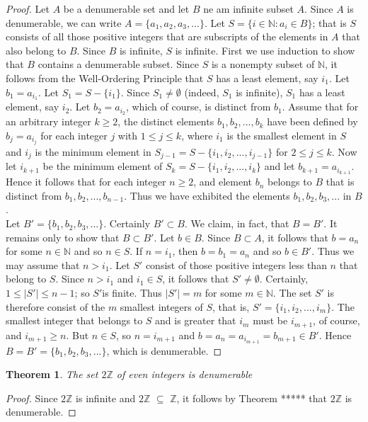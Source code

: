 \documentclass[10pt]{report}
\newtheorem{thm2}{Theorem}[section]
\begin{document}
\begin{proof}
Let $A$ be a denumerable set and let $B$ ne am infinite subset $A$. Since $A$ is denumerable, we can write $A = \{a_1, a_2, a_3,...\}$. Let $S=\{i\in \mathbb{N}: a_i\in B\}$; that is $S$ consists of all those positive integers that are subscripts of the elements in $A$ that also belong to $B$. Since $B$ is infinite, $S$ is infinite. First we use induction to show that $B$ contains a denumerable subset. Since $S$ is a nonempty subset of $\mathbb{N}$, it follows from the Well-Ordering Principle that $S$ has a least element, say $i_1$. Let $b_1=a_{i_1}$. Let $S_1=S-\{i_1\}$. Since $S_1\neq \emptyset$ (indeed, $S_1$ is infinite), $S_1$ has a least element, say $i_2$. Let $b_2=a_{i_2}$, which of course, is distinct from $b_1$. Assume that for an arbitrary integer $k\geq 2$, the distinct elements $b_1, b_2, ..., b_k$ have been defined by $b_j=a_{i_j}$ for each integer $j$ with $1\leq j \leq k$, where $i_1$ is the smallest element in $S$ and $i_j$ is the minimum element in $S_{j-1}=S-\{i_1, i_2, ..., i_{j-1}\}$ for $2\leq j\leq k$. Now let $i_{k+1}$ be the minimum element of $S_k= S-\{i_1, i_2, ..., i_k\}$ and let $b_{k+1}=a_{i_{k+1}}$. Hence it follows that for each integer $n\geq 2$, and element $b_n$ belongs to $B$ that is distinct from $b_1, b_2, ..., b_{n-1}$. Thus we have exhibited the elements $b_1, b_2, b_3,...$ in $B$.\\
Let $B'=\{b_1,b_2,b_3,...\}$. Certainly $B'\subset B$. We claim, in fact, that $B=B'$. It remains only to show that $B\subset B'$. Let $b\in B$. Since $B\subset A$, it follows that $b=a_n$ for some $n\in \mathbb{N}$ and so $n\in S$. If $n=i_1$, then $b=b_1=a_n$ and so $b\in B'$. Thus we may assume that $n > i_1$. Let $S'$ consist of those positive integers less than $n$ that belong to $S$. Since $n>i_1$ and $i_1 \in S$, it follows that $S'\neq \emptyset$. Certainly, $1\leq |S'| \leq n-1$; so $S'$is finite. Thus $|S'|=m$ for some $m\in \mathbb{N}$. The set $S'$ is therefore consist of the $m$ smallest integers of $S$, that is, $S'=\{i_1, i_2,..., i_m\}$. The smallest integer that belongs to $S$ and is greater that $i_m$ must be $i_{m+1}$, of course, and $i_{m+1} \geq n$. But $n\in S$, so $n=i_{m+1}$ and $b=a_n=a_{i_{m+1}}=b_{m+1} \in B'$. Hence $B=B'=\{b_1, b_2, b_3,...\}$, which is denumerable.
\end{proof}
\begin{thm2}
The set $2\mathbb{Z}$ of even integers is denumerable
\end{thm2}
\begin{proof}
Since $2\mathbb{Z}$ is infinite and $2\mathbb{Z}$ $\subseteq$ $\mathbb{Z}$, it follows by Theorem ***** that $2\mathbb{Z}$ is denumerable.
\end{proof}
\end{document}
